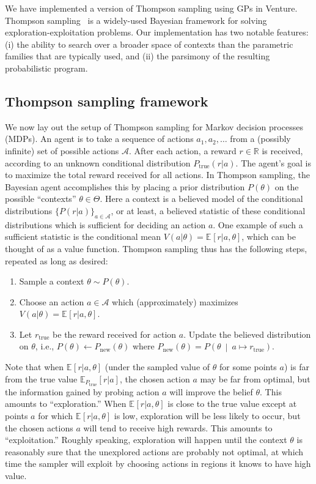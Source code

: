 \documentclass{article} %
\newcommand{\true}{{\textrm{true}}}
\newcommand{\rmnew}{{\textrm{new}}}
\newcommand{\Acal}{\mathcal{A}}
\newcommand{\R}{\mathbb{R}}
\newcommand{\pn}[1]{\left( #1 \right)}
\newcommand{\bkt}[1]{\left[ #1 \right]}
\newcommand{\Ebkt}[2][]{\mathbb{E}_{#1}\bkt{#2}}
\newcommand{\mvert}{\ \middle\vert\ }
\begin{document}
We have implemented a version of Thompson sampling using GPs in Venture.
Thompson sampling~\cite{thompson1933likelihood} is a widely-used Bayesian framework for solving exploration-exploitation problems.
Our implementation has two notable features: (i) the ability to search over a broader space of contexts than the parametric families that are typically used, and (ii) the parsimony of the resulting probabilistic program.

\subsection{Thompson sampling framework}
We now lay out the setup of Thompson sampling for Markov decision processes (MDPs).
An agent is to take a sequence of actions $a_1, a_2, \ldots$ from a (possibly infinite) set of possible actions $\Acal$.
After each action, a reward $r \in \R$ is received, according to an unknown conditional distribution $P_\true(r|a)$.
The agent's goal is to maximize the total reward received for all actions.
In Thompson sampling, the Bayesian agent accomplishes this by placing a prior distribution $P(\theta)$ on the possible ``contexts'' $\theta \in \Theta$.
Here a context is a believed model of the conditional distributions $\{P(r|a)\}_{a \in \Acal}$, or at least, a believed statistic of these conditional distributions which is sufficient for deciding an action $a$.
One example of such a sufficient statistic is the conditional mean $V(a|\theta) = \Ebkt{r|a,\theta}$, which can be thought of as a value function.
Thompson sampling thus has the following steps, repeated as long as desired:
\begin{enumerate}
  \item Sample a context $\theta \sim P(\theta)$.
  \item Choose an action $a \in \Acal$ which (approximately) maximizes $V(a|\theta) = \Ebkt{r|a,\theta}$.
  \item\label{itm:Thompson-conditioning}
    Let $r_\true$ be the reward received for action $a$.
    Update the believed distribution on $\theta$, i.e., $P(\theta) \gets P_\rmnew(\theta)$ where $P_\rmnew(\theta) = P\pn{\theta \mvert a \mapsto r_\true}$.
\end{enumerate}
Note that when $\Ebkt{r|a,\theta}$ (under the sampled value of $\theta$ for some points $a$) is far from the true value $\Ebkt[P_\true]{r|a}$, the chosen action $a$ may be far from optimal, but the information gained by probing action $a$ will improve the belief $\theta$.
This amounts to ``exploration.''
When $\Ebkt{r|a,\theta}$ is close to the true value except at points $a$ for which $\Ebkt{r|a,\theta}$ is low, exploration will be less likely to occur, but the chosen actions $a$ will tend to receive high rewards.
This amounts to ``exploitation.''
Roughly speaking, exploration will happen until the context $\theta$ is reasonably sure that the unexplored actions are probably not optimal, at which time the sampler will exploit by choosing actions in regions it knows to have high value.
\end{document}
